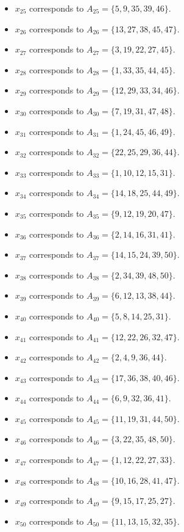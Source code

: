 \documentclass[11pt]{article}
\begin{document}
\begin{itemize}
\item $x_{25}$ corresponds to $A_{25}=\{5, 9, 35, 39, 46\}$.
\item $x_{26}$ corresponds to $A_{26}=\{13, 27, 38, 45, 47\}$.
\item $x_{27}$ corresponds to $A_{27}=\{3, 19, 22, 27, 45\}$.
\item $x_{28}$ corresponds to $A_{28}=\{1, 33, 35, 44, 45\}$.
\item $x_{29}$ corresponds to $A_{29}=\{12, 29, 33, 34, 46\}$.
\item $x_{30}$ corresponds to $A_{30}=\{7, 19, 31, 47, 48\}$.
\item $x_{31}$ corresponds to $A_{31}=\{1, 24, 45, 46, 49\}$.
\item $x_{32}$ corresponds to $A_{32}=\{22, 25, 29, 36, 44\}$.
\item $x_{33}$ corresponds to $A_{33}=\{1, 10, 12, 15, 31\}$.
\item $x_{34}$ corresponds to $A_{34}=\{14, 18, 25, 44, 49\}$.
\item $x_{35}$ corresponds to $A_{35}=\{9, 12, 19, 20, 47\}$.
\item $x_{36}$ corresponds to $A_{36}=\{2, 14, 16, 31, 41\}$.
\item $x_{37}$ corresponds to $A_{37}=\{14, 15, 24, 39, 50\}$.
\item $x_{38}$ corresponds to $A_{38}=\{2, 34, 39, 48, 50\}$.
\item $x_{39}$ corresponds to $A_{39}=\{6, 12, 13, 38, 44\}$.
\item $x_{40}$ corresponds to $A_{40}=\{5, 8, 14, 25, 31\}$.
\item $x_{41}$ corresponds to $A_{41}=\{12, 22, 26, 32, 47\}$.
\item $x_{42}$ corresponds to $A_{42}=\{2, 4, 9, 36, 44\}$.
\item $x_{43}$ corresponds to $A_{43}=\{17, 36, 38, 40, 46\}$.
\item $x_{44}$ corresponds to $A_{44}=\{6, 9, 32, 36, 41\}$.
\item $x_{45}$ corresponds to $A_{45}=\{11, 19, 31, 44, 50\}$.
\item $x_{46}$ corresponds to $A_{46}=\{3, 22, 35, 48, 50\}$.
\item $x_{47}$ corresponds to $A_{47}=\{1, 12, 22, 27, 33\}$.
\item $x_{48}$ corresponds to $A_{48}=\{10, 16, 28, 41, 47\}$.
\item $x_{49}$ corresponds to $A_{49}=\{9, 15, 17, 25, 27\}$.
\item $x_{50}$ corresponds to $A_{50}=\{11, 13, 15, 32, 35\}$.

\end{itemize}
\end{document}
